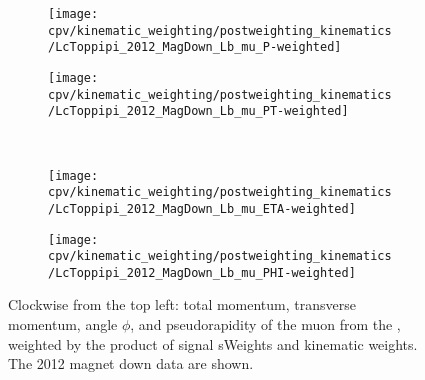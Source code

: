 \begin{figure}
  \begin{subfigure}[b]{0.4\textwidth}
    \texttt{[image: cpv/kinematic\_weighting/postweighting\_kinematics/LcToppipi\_2012\_MagDown\_Lb\_mu\_P-weighted]}
    \label{fig:cpv:kinematic_weighting:post:Lb_mu:P}
  \end{subfigure}
  \begin{subfigure}[b]{0.4\textwidth}
    \texttt{[image: cpv/kinematic\_weighting/postweighting\_kinematics/LcToppipi\_2012\_MagDown\_Lb\_mu\_PT-weighted]}
    \label{fig:cpv:kinematic_weighting:post:Lb_mu:PT}
  \end{subfigure}\\
  \begin{subfigure}[b]{0.4\textwidth}
    \texttt{[image: cpv/kinematic\_weighting/postweighting\_kinematics/LcToppipi\_2012\_MagDown\_Lb\_mu\_ETA-weighted]}
    \label{fig:cpv:kinematic_weighting:post:Lb_mu:ETA}
  \end{subfigure}
  \begin{subfigure}[b]{0.4\textwidth}
    \texttt{[image: cpv/kinematic\_weighting/postweighting\_kinematics/LcToppipi\_2012\_MagDown\_Lb\_mu\_PHI-weighted]}
    \label{fig:cpv:kinematic_weighting:post:Lb_mu:PHI}
  \end{subfigure}
  \caption{%
    Clockwise from the top left: total momentum, transverse momentum, angle
    $\phi$, and pseudorapidity of the muon from the \PLambdab, weighted by the
    product of signal sWeights and kinematic weights.
    The 2012 magnet down data are shown.
  }
  \label{fig:cpv:kinematic_weighting:post:Lb_mu}
\end{figure}

